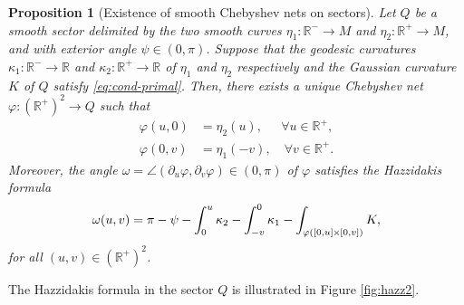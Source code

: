 \documentclass{article}
\newcommand{\PLH}{{\mkern-1mu\times\mkern-1mu}}
\newcommand{\Times}{\PLH}
\newcommand{\R}{\mathbb{R}}
\newcommand{\surf}{M}
\newcommand{\ko}{\kappa}
\newcommand{\sect}{Q}
\newtheorem{proposition}[theorem]{Proposition}
\theoremstyle{remark}
\theoremstyle{prpart}
\begin{document}
\begin{proposition}[Existence of smooth Chebyshev nets on sectors]\label{prop:sector}
  Let $\sect$ be a smooth sector delimited by the two smooth curves $\eta_1:\R^-\to\surf$ and $\eta_2:\R^+\to\surf$, and with exterior angle $\psi\in(0,\pi)$. Suppose that the geodesic curvatures $\ko_1:\R^-\to\R$ and $\ko_2:\R^+\to\R$ of $\eta_1$ and $\eta_2$ respectively and the Gaussian curvature $K$ of $\sect$ satisfy \eqref{eq:cond-primal}. Then, there exists a unique Chebyshev net $\varphi : (\R^+)^2\to  \sect$ such that
\begin{equation}\label{eq:bound-cond-c4}
\begin{split}
  \varphi(u, 0) &= \eta_2(u), \quad~~\forall u\in\R^+,\\
  \varphi(0,v) &= \eta_1(-v),\quad\forall v\in\R^+.
\end{split}
\end{equation}
Moreover, the angle $\omega=\angle(\partial_u\varphi,\partial_v\varphi)\in(0,\pi)$ of $\varphi$ satisfies the Hazzidakis formula
\begin{equation}\label{eq:hazz2-c4}
\omega(u,v) = \pi - \psi - \int_0^u \ko_2 - \int_{-v}^0 \ko_1 - \int_{\varphi([0,u]\Times[0,v])} K,
\end{equation}
for all $(u,v)\in (\R^+)^2$.
\end{proposition}
The Hazzidakis formula in the sector $\sect$ is illustrated in Figure \ref{fig:hazz2}.
\end{document}
